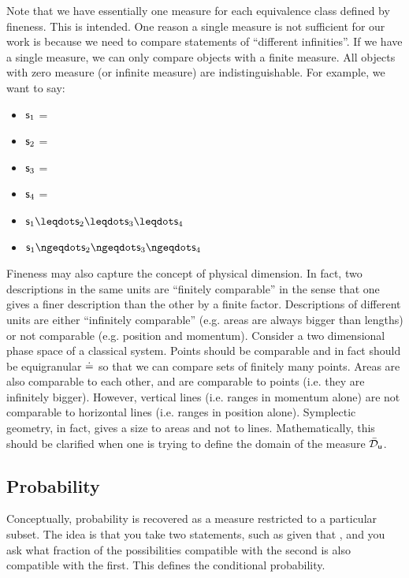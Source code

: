 \documentclass[11pt,letterpaper,fleqn]{memoir} %
\begin{document}
Note that we have essentially one measure for each equivalence class defined by fineness. This is intended. One reason a single measure is not sufficient for our work is because we need to compare statements of ``different infinities''. If we have a single measure, we can only compare objects with a finite measure. All objects with zero measure (or infinite measure) are indistinguishable. For example, we want to say:
\begin{itemize}
	\item $\stmt_1$ = 
	\item $\stmt_2$ = 
	\item $\stmt_3$ = 
	\item $\stmt_4$ = 
	\item $\stmt_1 \finer \stmt_2 \finer \stmt_3 \finer \stmt_4$
	\item $\stmt_1 \ncoarser \stmt_2 \ncoarser \stmt_3 \ncoarser \stmt_4$
\end{itemize}

Fineness may also capture the concept of physical dimension. In fact, two descriptions in the same units are ``finitely comparable'' in the sense that one gives a finer description than the other by a finite factor. Descriptions of different units are either ``infinitely comparable'' (e.g. areas are always bigger than lengths) or not comparable (e.g. position and momentum). Consider a two dimensional phase space of a classical system. Points should be comparable and in fact should be equigranular $\eqgran$ so that we can compare sets of finitely many points. Areas are also comparable to each other, and are comparable to points (i.e. they are infinitely bigger). However, vertical lines (i.e. ranges in momentum alone) are not comparable to horizontal lines (i.e. ranges in position alone). Symplectic geometry, in fact, gives a size to areas and not to lines. Mathematically, this should be clarified when one is trying to define the domain of the measure $\tdomain_{\stmt[u]}$.

\subsection{Probability}

Conceptually, probability is recovered as a measure restricted to a particular subset. The idea is that you take two statements, such as  given that , and you ask what fraction of the possibilities compatible with the second is also compatible with the first. This defines the conditional probability.
\end{document}
